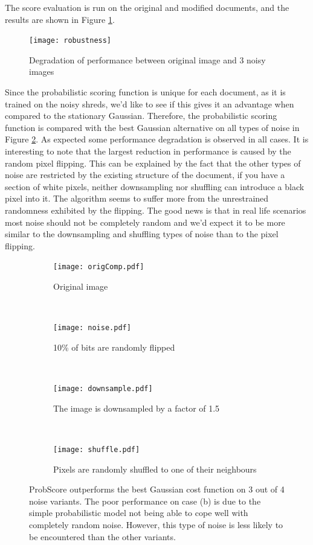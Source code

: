 The score evaluation is run on the original and modified documents, and the results are shown in Figure \ref{fig:robustness}. 

\begin{figure}[H]
\centering
\texttt{[image: robustness]}
\caption{Degradation of performance between original image and 3 noisy images}
\label{fig:robustness}
\end{figure}

Since the probabilistic scoring function is unique for each document, as it is trained on the noisy shreds, we'd like to see if this gives it an advantage when compared to the stationary Gaussian. Therefore, the probabilistic scoring function is compared with the best Gaussian alternative on all types of noise in Figure \ref{fig:robComp}. As expected some performance degradation is observed in all cases. It is interesting to note that the largest reduction in performance is caused by the random pixel flipping. This can be explained by the fact that the other types of noise are restricted by the existing structure of the document, if you have a section of white pixels, neither downsampling nor shuffling can introduce a black pixel into it. The algorithm seems to suffer more from the unrestrained randomness exhibited by the flipping. The good news is that in real life scenarios most noise should not be completely random and we'd expect it to be more similar to the downsampling and shuffling types of noise than to the pixel flipping.

\begin{figure}[h]
        \centering
        \begin{subfigure}[b]{0.49\textwidth}
                \centering
                \texttt{[image: origComp.pdf]}
                \caption{Original image}
        \end{subfigure}
        ~ 
        \begin{subfigure}[b]{0.49\textwidth}
                \centering
                \texttt{[image: noise.pdf]}
                \caption{10\% of bits are randomly flipped}
        \end{subfigure}
        ~ 
        \begin{subfigure}[b]{0.49\textwidth}
                \centering
                \texttt{[image: downsample.pdf]}
                \caption{The image is downsampled by a factor of 1.5}
        \end{subfigure}
        ~ 
        \begin{subfigure}[b]{0.49\textwidth}
                \centering
                \texttt{[image: shuffle.pdf]}
                \caption{Pixels are randomly shuffled to one of their neighbours}
        \end{subfigure}
        \caption{ProbScore outperforms the best Gaussian cost function on 3 out of 4 noise variants. The poor performance on case (b) is due to the simple probabilistic model not being able to cope well with completely random noise. However, this type of noise is less likely to be encountered than the other variants.}
        \label{fig:robComp}
\end{figure}

